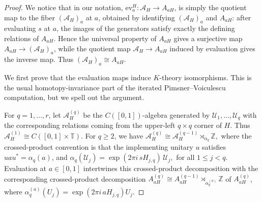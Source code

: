 \documentclass[11pt]{amsart}
\theoremstyle{definition}
\theoremstyle{remark}
\newcommand{\T}{\mathbb{T}}
\newcommand{\Z}{\mathbb{Z}}
\newcommand{\ev}{\mathrm{ev}}
\begin{document}
\begin{proof}We notice that in our notation, $\ev_a^H\colon \mathcal A_H\longrightarrow A_{aH}$, is simply the quotient map to the fiber $(\mathcal A_H)_a$ at $a$, obtained by identifying $(\mathcal A_H)_a$ and $A_{aH}$: after evaluating $s$ at $a$, the images of the generators satisfy exactly
the defining relations of $A_{aH}$. Hence the universal property of
$A_{aH}$ gives a surjective map $A_{aH}\to(\mathcal A_H)_a$, while the
quotient map $\mathcal A_H\to A_{aH}$ induced by evaluation gives the inverse
map. Thus $(\mathcal A_H)_a\cong A_{aH}$.

We first prove that the evaluation maps induce $K$-theory isomorphisms. 
This is the usual homotopy-invariance part of the iterated Pimsner--Voiculescu
computation, but we spell out the argument.

For $q=1,\ldots,r$, let $\mathcal A_H^{(q)}$ be the
$C([0,1])$-algebra generated by $\mathcal U_1,\ldots,\mathcal U_q$ with
the corresponding relations coming from the upper-left $q\times q$ corner of
$H$. Thus $\mathcal A_H^{(1)}\cong C([0,1]\times\T).$
For $q\geq2$, we have $\mathcal A_H^{(q)}
\cong
\mathcal A_H^{(q-1)}\rtimes_{\alpha_q}\Z,$
where the crossed-product convention is that the implementing unitary $u$
satisfies $uau^*=\alpha_q(a)$, and $\alpha_q(\mathcal U_j)
=
\exp(2\pi i\,sH_{j,q})\,\mathcal U_j,$ for all $1\leq j<q.$  Evaluation at $a\in[0,1]$ intertwines this crossed-product decomposition with
the corresponding crossed-product decomposition $A_{aH}^{(q)}
\cong
A_{aH}^{(q-1)}\rtimes_{\alpha_q^{(a)}}\Z $ of $A_{aH}^{(q)}$, where $\alpha_q^{(a)}(U_j)
=
\exp(2\pi i\,aH_{j,q})U_j.$


\end{proof}
\end{document}
